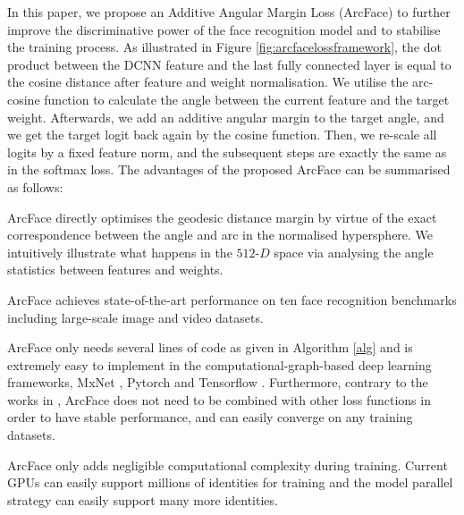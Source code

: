 \documentclass[10pt,twocolumn,letterpaper]{article}
\begin{document}
In this paper, we propose an Additive Angular Margin Loss (ArcFace) to further improve the discriminative power of the face recognition model and to stabilise the training process. As illustrated in Figure \ref{fig:arcfacelossframework}, the dot product between the DCNN feature and the last fully connected layer is equal to the cosine distance after feature and weight normalisation. We utilise the arc-cosine function to calculate the angle between the current feature and the target weight. Afterwards, we add an additive angular margin to the target angle, and we get the target logit back again by the cosine function. Then, we re-scale all logits by a fixed feature norm, and the subsequent steps are exactly the same as in the softmax loss. The advantages of the proposed ArcFace can be summarised as follows:

 ArcFace directly optimises the geodesic distance margin by virtue of the exact correspondence between the angle and arc in the normalised hypersphere. We intuitively illustrate what happens in the $512$-$D$ space via analysing the angle statistics between features and weights.

 ArcFace achieves state-of-the-art performance on ten face recognition benchmarks including large-scale image and video datasets. 

 ArcFace only needs several lines of code as given in Algorithm \ref{alg} and is extremely easy to implement in the computational-graph-based deep learning frameworks, \eg MxNet \cite{chen2015mxnet}, Pytorch \cite{paszke2017automatic} and Tensorflow \cite{abadi2016tensorflow}. Furthermore, contrary to the works in \cite{liu2017sphereface,liu2016large}, ArcFace does not need to be combined with other loss functions in order to have stable performance, 
and can easily converge on any training datasets.

 ArcFace only adds negligible computational complexity during training. Current GPUs can easily support millions of identities for training and the model parallel strategy can easily support many more identities. 
\end{document}
